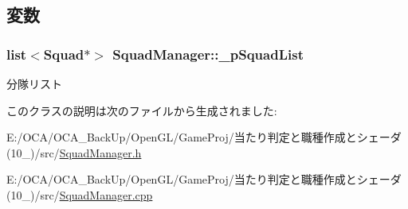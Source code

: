\subsection{変数}
\hypertarget{class_squad_manager_a17789c2fcc2a22b3af6ddd0101955576}{
\subsubsection[{\-\_\-p\-Squad\-List}]{\setlength{\rightskip}{0pt plus 5cm}list$<${\bf Squad}$\ast$$>$ Squad\-Manager\-::\-\_\-p\-Squad\-List\hspace{0.3cm}{\ttfamily [protected]}}}\label{class_squad_manager_a17789c2fcc2a22b3af6ddd0101955576}


分隊リスト 



このクラスの説明は次のファイルから生成されました\-:\begin{DoxyCompactItemize}
\item 
E\-:/\-O\-C\-A/\-O\-C\-A\-\_\-\-Back\-Up/\-Open\-G\-L/\-Game\-Proj/当たり判定と職種作成とシェーダ(10\-\_)/src/\hyperlink{_squad_manager_8h}{Squad\-Manager.\-h}\item 
E\-:/\-O\-C\-A/\-O\-C\-A\-\_\-\-Back\-Up/\-Open\-G\-L/\-Game\-Proj/当たり判定と職種作成とシェーダ(10\-\_)/src/\hyperlink{_squad_manager_8cpp}{Squad\-Manager.\-cpp}\end{DoxyCompactItemize}
